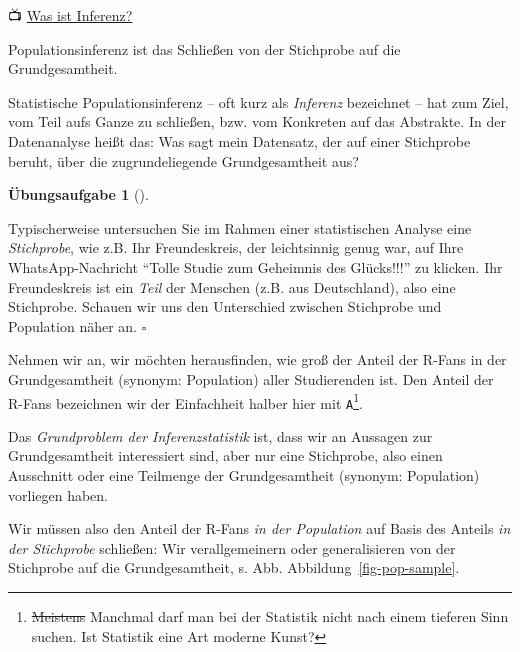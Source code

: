 \documentclass[
  ngerman,
  letterpaper,
  twoside,
  open=any]{scrbook}
\theoremstyle{definition}
\theoremstyle{plain}
\theoremstyle{definition}
\newtheorem{exercise}{Übungsaufgabe}[chapter]
\theoremstyle{definition}
\theoremstyle{remark}
\begin{document}
📺
\href{https://www.youtube.com/watch?v=QNMVi6IqQ90&list=PLRR4REmBgpIGgz2Oe2Z9FcoLYBDnaWatN}{Was
ist Inferenz?}

Populationsinferenz ist das Schließen von der Stichprobe auf die
Grundgesamtheit.

Statistische Populationsinferenz -- oft kurz als \emph{Inferenz}
bezeichnet -- hat zum Ziel, vom Teil aufs Ganze zu schließen, bzw. vom
Konkreten auf das Abstrakte. In der Datenanalyse heißt das: Was sagt
mein Datensatz, der auf einer Stichprobe beruht, über die
zugrundeliegende Grundgesamtheit aus?

\begin{exercise}[]\protect\hypertarget{exr-stipro}{}\label{exr-stipro}

Typischerweise untersuchen Sie im Rahmen einer statistischen Analyse
eine \emph{Stichprobe}, wie z.B. Ihr Freundeskreis, der leichtsinnig
genug war, auf Ihre WhatsApp-Nachricht \enquote{Tolle Studie zum
Geheimnis des Glücks!!!} zu klicken. Ihr Freundeskreis ist ein
\emph{Teil} der Menschen (z.B. aus Deutschland), also eine Stichprobe.
Schauen wir uns den Unterschied zwischen Stichprobe und Population näher
an. \(\square\)

\end{exercise}

Nehmen wir an, wir möchten herausfinden, wie groß der Anteil der R-Fans
in der Grundgesamtheit (synonym: Population) aller Studierenden ist. Den
Anteil der R-Fans bezeichnen wir der Einfachheit halber hier mit
\texttt{A}\footnote{\st{Meistens} Manchmal darf man bei der Statistik
  nicht nach einem tieferen Sinn suchen. Ist Statistik eine Art moderne
  Kunst?}.

Das \emph{Grundproblem der Inferenzstatistik} ist, dass wir an Aussagen
zur Grundgesamtheit interessiert sind, aber nur eine Stichprobe, also
einen Ausschnitt oder eine Teilmenge der Grundgesamtheit (synonym:
Population) vorliegen haben.

Wir müssen also den Anteil der R-Fans \emph{in der Population} auf Basis
des Anteils \emph{in der Stichprobe} schließen: Wir verallgemeinern oder
generalisieren von der Stichprobe auf die Grundgesamtheit, s. Abb.
Abbildung~\ref{fig-pop-sample}.
\end{document}

